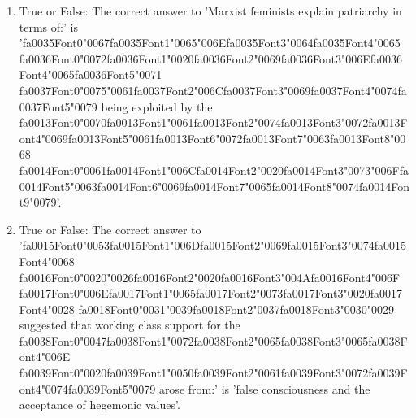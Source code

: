 \documentclass[12pt]{article}
\begin{document}
\begin{enumerate}[label=\arabic*.]
\item True or False: The correct answer to 'Marxist feminists explain patriarchy in terms of:' is '{\csname fa0035Font0\endcsname\char"0067}{\csname fa0035Font1\endcsname\char"0065}{\char"006E}{\csname fa0035Font3\endcsname\char"0064}{\csname fa0035Font4\endcsname\char"0065} {\csname fa0036Font0\endcsname\char"0072}{\csname fa0036Font1\endcsname\char"0020}{\csname fa0036Font2\endcsname\char"0069}{\csname fa0036Font3\endcsname\char"006E}{\csname fa0036Font4\endcsname\char"0065}{\csname fa0036Font5\endcsname\char"0071} {\csname fa0037Font0\endcsname\char"0075}{\char"0061}{\csname fa0037Font2\endcsname\char"006C}{\csname fa0037Font3\endcsname\char"0069}{\csname fa0037Font4\endcsname\char"0074}{\csname fa0037Font5\endcsname\char"0079} being exploited by the {\csname fa0013Font0\endcsname\char"0070}{\csname fa0013Font1\endcsname\char"0061}{\csname fa0013Font2\endcsname\char"0074}{\csname fa0013Font3\endcsname\char"0072}{\csname fa0013Font4\endcsname\char"0069}{\csname fa0013Font5\endcsname\char"0061}{\csname fa0013Font6\endcsname\char"0072}{\csname fa0013Font7\endcsname\char"0063}{\csname fa0013Font8\endcsname\char"0068} {\csname fa0014Font0\endcsname\char"0061}{\csname fa0014Font1\endcsname\char"006C}{\csname fa0014Font2\endcsname\char"0020}{\csname fa0014Font3\endcsname\char"0073}{\char"006F}{\csname fa0014Font5\endcsname\char"0063}{\csname fa0014Font6\endcsname\char"0069}{\csname fa0014Font7\endcsname\char"0065}{\csname fa0014Font8\endcsname\char"0074}{\csname fa0014Font9\endcsname\char"0079}'.
\item True or False: The correct answer to '{\csname fa0015Font0\endcsname\char"0053}{\csname fa0015Font1\endcsname\char"006D}{\csname fa0015Font2\endcsname\char"0069}{\csname fa0015Font3\endcsname\char"0074}{\csname fa0015Font4\endcsname\char"0068} {\csname fa0016Font0\endcsname\char"0020}{\char"0026}{\csname fa0016Font2\endcsname\char"0020}{\csname fa0016Font3\endcsname\char"004A}{\csname fa0016Font4\endcsname\char"006F} {\csname fa0017Font0\endcsname\char"006E}{\csname fa0017Font1\endcsname\char"0065}{\csname fa0017Font2\endcsname\char"0073}{\csname fa0017Font3\endcsname\char"0020}{\csname fa0017Font4\endcsname\char"0028} {\csname fa0018Font0\endcsname\char"0031}{\char"0039}{\csname fa0018Font2\endcsname\char"0037}{\csname fa0018Font3\endcsname\char"0030}{\char"0029} suggested that working class support for the {\csname fa0038Font0\endcsname\char"0047}{\csname fa0038Font1\endcsname\char"0072}{\csname fa0038Font2\endcsname\char"0065}{\csname fa0038Font3\endcsname\char"0065}{\csname fa0038Font4\endcsname\char"006E} {\csname fa0039Font0\endcsname\char"0020}{\csname fa0039Font1\endcsname\char"0050}{\csname fa0039Font2\endcsname\char"0061}{\csname fa0039Font3\endcsname\char"0072}{\csname fa0039Font4\endcsname\char"0074}{\csname fa0039Font5\endcsname\char"0079} arose from:' is 'false consciousness and the acceptance of hegemonic values'.

\end{enumerate}
\end{document}
